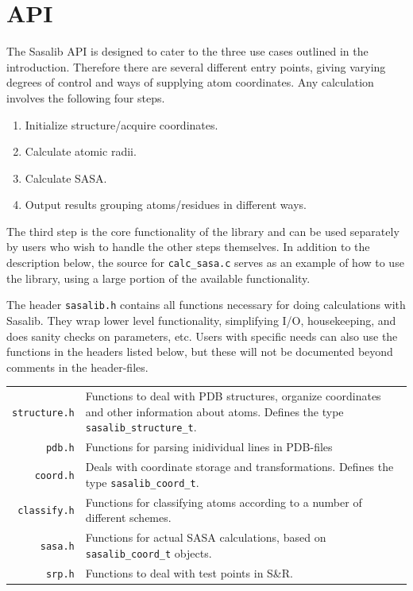 \documentclass[a4paper,11pt]{article}
\begin{document}
\section{API} \label{sec:using}

The Sasalib API is designed to cater to the three use cases outlined
in the introduction. Therefore there are several different entry
points, giving varying degrees of control and ways of supplying atom
coordinates. Any calculation involves the following four steps.
\begin{enumerate}
  \item Initialize structure/acquire coordinates.
  \item Calculate atomic radii.
  \item Calculate SASA.
  \item Output results grouping atoms/residues in different ways.
\end{enumerate}
The third step is the core functionality of the library and can be
used separately by users who wish to handle the other steps
themselves. In addition to the description below, the source for
\texttt{calc\_sasa.c} serves as an example of how to use the library,
using a large portion of the available functionality.

The header \texttt{sasalib.h} contains all functions necessary for
doing calculations with Sasalib. They wrap lower level functionality,
simplifying I/O, housekeeping, and does sanity checks on parameters,
etc. Users with specific needs can also use the functions in the
headers listed below, but these will not be documented beyond comments
in the header-files.

\begin{tabular}{r>{\raggedright\arraybackslash}p{}}
\texttt{structure.h} & Functions to deal with PDB structures,  
                       organize coordinates and other information
                       about atoms. Defines the type 
                       \verb|sasalib_structure_t|.\\
\texttt{pdb.h} & Functions for parsing inidividual lines in PDB-files \\
\texttt{coord.h} & Deals with coordinate storage and transformations. Defines
                   the type \verb|sasalib_coord_t|.\\
\texttt{classify.h} & Functions for classifying atoms according
                      to a number of different schemes.\\
\texttt{sasa.h} & Functions for actual SASA calculations, based on
                  \verb|sasalib_coord_t| objects.\\
\texttt{srp.h} & Functions to deal with test points in S\&R. \\
\end{tabular}
\end{document}
